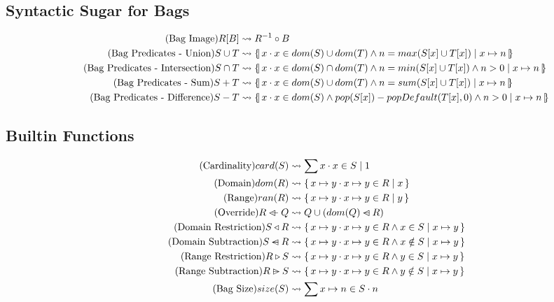 \documentclass{article}
\newcommand{\bSet}[3]{%
  \{\, #1 \cdot #2 \mid #3 \, \}%
}
\newcommand{\lbbar}{\{\kern-0.5ex|}
\newcommand{\rbbar}{|\kern-0.5ex\}}
\newcommand{\bag}[3]{%
  \lbbar \, #1 \cdot #2 \mid #3 \, \rbbar%
}
\begin{document}
\subsection{Syntactic Sugar for Bags}
\begin{align}
  \tag{Bag Image}
  R[B]
  &\leadsto
  R^{-1} \circ B
  \\
  \tag{Bag Predicates - Union}
  S \cup T &\leadsto \bag{x}{x \in dom(S) \cup dom(T) \land n = max(S[x] \cup T[x])}{x \mapsto n}
  \\
  \tag{Bag Predicates - Intersection}
  S \cap T &\leadsto \bag{x}{x \in dom(S) \cap dom(T) \land n = min(S[x] \cup T[x]) \land n > 0}{x \mapsto n}
  \\
  \tag{Bag Predicates - Sum}
  S + T &\leadsto \bag{x}{x \in dom(S) \cup dom(T) \land n = sum(S[x] \cup T[x])}{x \mapsto n}
  \\
  \tag{Bag Predicates - Difference}
  S - T &\leadsto \bag{x}{x \in dom(S) \land pop(S[x]) - popDefault(T[x], 0) \land n > 0}{x \mapsto n}
\end{align}
\subsection{Builtin Functions}

\noindent\begin{minipage}{\linewidth}
\begin{align}
  \tag{Cardinality}
  card(S)
  &\leadsto
  \sum x \cdot x \in S \mid 1
  \\
  \tag{Domain}
  dom(R)
  &\leadsto
  \bSet{x \mapsto y}{x \mapsto y \in R}{x}
  \\
  \tag{Range}
  ran(R)
  &\leadsto
  \bSet{x \mapsto y}{x \mapsto y \in R}{y}
  \\
  \tag{Override}
  R \ovl Q &\leadsto Q \cup (dom(Q) \domsub R)
  \\
  \tag{Domain Restriction}
  S \triangleleft R &\leadsto \bSet{x\mapsto y}{x \mapsto y \in R \land x \in S}{x \mapsto y}
  \\
  \tag{Domain Subtraction}
  S \domsub R &\leadsto \bSet{x\mapsto y}{x \mapsto y \in R \land x \notin S}{x \mapsto y}
  \\
  \tag{Range Restriction}
  R \triangleright S &\leadsto \bSet{x\mapsto y}{x \mapsto y \in R \land y \in S}{x \mapsto y}
  \\
  \tag{Range Subtraction}
  R \ransub S &\leadsto \bSet{x\mapsto y}{x \mapsto y \in R \land y \notin S}{x \mapsto y}
  \\
  \tag{Bag Size}
  size(S) &\leadsto \sum x \mapsto n \in S \cdot n
\end{align}
\end{minipage}
\end{document}
